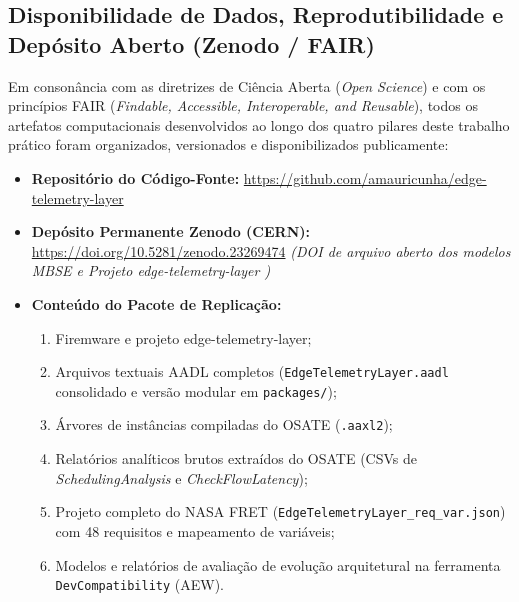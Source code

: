 \subsection*{Disponibilidade de Dados, Reprodutibilidade e Depósito Aberto (Zenodo / FAIR)}

Em consonância com as diretrizes de Ciência Aberta (\textit{Open Science}) e com os princípios FAIR (\textit{Findable, Accessible, Interoperable, and Reusable}), todos os artefatos computacionais desenvolvidos ao longo dos quatro pilares deste trabalho prático foram organizados, versionados e disponibilizados publicamente:

\begin{tcolorbox}[colback=blue!5!white,colframe=ufscblue,title=\textbf{Pacote de Reprodutibilidade Científica e Modelos MBSE}]
\small\raggedright
\begin{itemize}[leftmargin=1.2em]
    \item \textbf{Repositório do Código-Fonte:} \url{https://github.com/amauricunha/edge-telemetry-layer}
    \item \textbf{Depósito Permanente Zenodo (CERN):} \url{https://doi.org/10.5281/zenodo.23269474} \textit{(DOI de arquivo aberto dos modelos MBSE e Projeto edge-telemetry-layer )}
    \item \textbf{Conteúdo do Pacote de Replicação:}
    \begin{enumerate}[leftmargin=1.2em]
        \item Firemware e projeto  edge-telemetry-layer;
        \item Arquivos textuais AADL completos (\texttt{EdgeTelemetryLayer.aadl} consolidado e versão modular em \texttt{packages/});
        \item Árvores de instâncias compiladas do OSATE (\texttt{.aaxl2});
        \item Relatórios analíticos brutos extraídos do OSATE (CSVs de \textit{SchedulingAnalysis} e \textit{CheckFlowLatency});
        \item Projeto completo do NASA FRET (\texttt{EdgeTelemetryLayer\_req\_var.json}) com 48 requisitos e mapeamento de variáveis;
        \item Modelos e relatórios de avaliação de evolução arquitetural na ferramenta \texttt{DevCompatibility} (AEW).
    \end{enumerate}
\end{itemize}
\end{tcolorbox}

